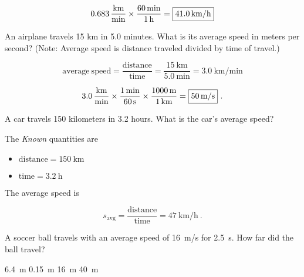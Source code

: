 \documentclass[answers]{exam}
\begin{document}
\begin{questions}
\begin{questions}
\begin{solution}
\begin{equation*}
    \SI[per-mode=fraction]{0.683}{\kilo\meter\per\minute} \times \frac{\SI{60}{\min}}{\SI{1}{\hour}} = \framebox{\SI{41.0}{\kilo\meter/\hour}}
\end{equation*}
\end{solution}

\question
An airplane travels 15 km in 5.0 minutes. What is its average speed in meters per second? (Note: Average speed is distance traveled divided by time of travel.)

\begin{solution}
\begin{equation*}
    \mathrm{average\ speed = \frac{distance}{time}} = \frac{\SI{15}{\kilo\meter}}{\SI{5.0}{\minute}} = \SI[per-mode=fraction]{3.0}{\kilo\meter\per\minute}
\end{equation*}

\begin{equation*}
    \SI[per-mode=fraction]{3.0}{\kilo\meter\per\minute} \times \frac{\SI{1}{\minute}}{\SI{60}{\second}} \times \frac{\SI{1000}{\meter}}{\SI{1}{\kilo\meter}} = \framebox{\SI{50}{\meter/\second}}\ .
\end{equation*}
\end{solution}


\question
A car travels 150 kilometers in 3.2 hours. What is the car's average speed?

\begin{solution}
The \textit{Known} quantities are

\begin{itemize}
    \item $\mathrm{distance} = \SI{150}{\km}$
    \item $\mathrm{time} = \SI{3.2}{\hour}$
\end{itemize}

The average speed is

\begin{equation*}
    s_{\mathrm{avg}} = \mathrm{\frac{distance}{time}} = \SI[per-mode=symbol]{47}{\km\per\hour}\ .
\end{equation*}
\end{solution}

\question
A soccer ball travels with an average speed of \SI{16}{m/s} for \SI{2.5}{s}. How far did the ball travel?

\begin{choices}
    \choice \SI{6.4}{m}
    \choice \SI{0.15}{m}
    \choice \SI{16}{m}
    \correctchoice \SI{40}{m}
\end{choices}


\end{questions}
\end{questions}
\end{document}
